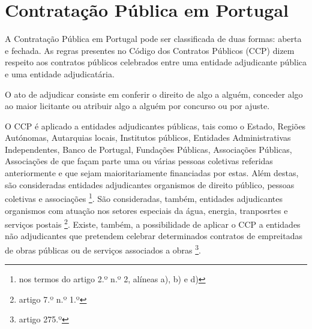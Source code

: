 \section{Contratação Pública em Portugal}


A Contratação Pública em Portugal pode ser classificada de duas formas: aberta e fechada. As regras presentes no Código dos Contratos Públicos (CCP) dizem respeito aos contratos públicos celebrados entre uma entidade adjudicante pública e uma entidade adjudicatária.


O ato de adjudicar consiste em conferir o direito de algo a alguém, conceder algo ao maior licitante ou atribuir algo a alguém por concurso ou por ajuste. 

O CCP é aplicado a entidades adjudicantes públicas, tais como o Estado, Regiões Autónomas, Autarquias locais, Institutos públicos, Entidades Administrativas Independentes, Banco de Portugal, Fundações Públicas, Associações Públicas, Associações de que façam parte uma ou várias pessoas coletivas referidas anteriormente e que sejam maioritariamente financiadas por estas. Além destas, são consideradas entidades adjudicantes organismos de direito público, pessoas coletivas e associações \footnote{nos termos do artigo 2.º n.º 2, alíneas a), b) e d)}. São consideradas, também, entidades adjudicantes organismos com atuação nos setores especiais da água, energia, tranposrtes e serviços postais \footnote{artigo 7.º n.º 1.º}. Existe, também, a possibilidade de aplicar o CCP a entidades não adjudicantes que pretendem celebrar determinados contratos de empreitadas de obras públicas ou de serviços associados a obras \footnote{artigo 275.º}.



